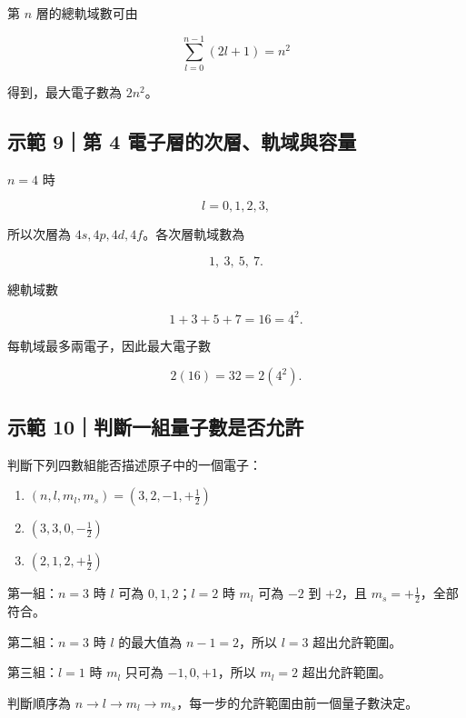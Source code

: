 \documentclass[11pt,a4paper]{article}
\providecommand{\tightlist}{%
  \setlength{\itemsep}{0pt}\setlength{\parskip}{0pt}}
\begin{document}
第 \(n\) 層的總軌域數可由

\[
\sum_{l=0}^{n-1}(2l+1)=n^2
\]

得到，最大電子數為 \(2n^2\)。

\begin{HandoutWorkedExample}

\subsection{示範 9｜第 4 電子層的次層、軌域與容量}\label{ux793aux7bc4-9ux7b2c-4-ux96fbux5b50ux5c64ux7684ux6b21ux5c64ux8eccux57dfux8207ux5bb9ux91cf}

\(n=4\) 時

\[
l=0,1,2,3,
\]

所以次層為 \(4s,4p,4d,4f\)。各次層軌域數為

\[
1,\ 3,\ 5,\ 7.
\]

總軌域數

\[
1+3+5+7=16=4^2.
\]

每軌域最多兩電子，因此最大電子數

\[
2(16)=32=2(4^2).
\]

\end{HandoutWorkedExample}

\begin{HandoutWorkedExample}

\subsection{示範 10｜判斷一組量子數是否允許}\label{ux793aux7bc4-10ux5224ux65b7ux4e00ux7d44ux91cfux5b50ux6578ux662fux5426ux5141ux8a31}

判斷下列四數組能否描述原子中的一個電子：

\begin{enumerate}
\def\labelenumi{\arabic{enumi}.}
\tightlist
\item
  \((n,l,m_l,m_s)=(3,2,-1,+\frac12)\)
\item
  \((3,3,0,-\frac12)\)
\item
  \((2,1,2,+\frac12)\)
\end{enumerate}

第一組：\(n=3\) 時 \(l\) 可為 \(0,1,2\)；\(l=2\) 時 \(m_l\) 可為 \(-2\) 到 \(+2\)，且 \(m_s=+\frac12\)，全部符合。

第二組：\(n=3\) 時 \(l\) 的最大值為 \(n-1=2\)，所以 \(l=3\) 超出允許範圍。

第三組：\(l=1\) 時 \(m_l\) 只可為 \(-1,0,+1\)，所以 \(m_l=2\) 超出允許範圍。

判斷順序為 \(n\to l\to m_l\to m_s\)，每一步的允許範圍由前一個量子數決定。

\end{HandoutWorkedExample}
\end{document}
